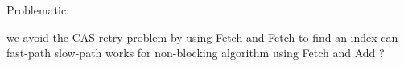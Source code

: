Problematic:

we avoid the CAS retry problem by using Fetch and Fetch to find an index
can fast-path slow-path works for non-blocking algorithm using Fetch and Add ?
